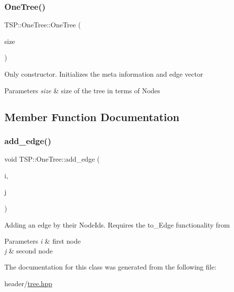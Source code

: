 \subsubsection{\texorpdfstring{One\+Tree()}{OneTree()}}
{\footnotesize\ttfamily T\+S\+P\+::\+One\+Tree\+::\+One\+Tree (\begin{DoxyParamCaption}\item[{size\+\_\+t}]{size }\end{DoxyParamCaption})\hspace{0.3cm}{\ttfamily [inline]}}

Only constructor. Initializes the meta information and edge vector 
\begin{DoxyParams}{Parameters}
{\em size} & size of the tree in terms of Nodes \\
\hline
\end{DoxyParams}


\subsection{Member Function Documentation}
\mbox{\label{classTSP_1_1OneTree_a1fbf0dcc64bb859a04cd9d04298d8608}} 
\subsubsection{\texorpdfstring{add\+\_\+edge()}{add\_edge()}}
{\footnotesize\ttfamily void T\+S\+P\+::\+One\+Tree\+::add\+\_\+edge (\begin{DoxyParamCaption}\item[{Node\+Id}]{i,  }\item[{Node\+Id}]{j }\end{DoxyParamCaption})\hspace{0.3cm}{\ttfamily [inline]}}

Adding an edge by their Node\+Ids. Requires the to\+\_\+\+Edge functionality from
\begin{DoxyParams}{Parameters}
{\em i} & first node \\
\hline
{\em j} & second node \\
\hline
\end{DoxyParams}


The documentation for this class was generated from the following file\+:\begin{DoxyCompactItemize}
\item 
header/\hyperlink{tree_8hpp}{tree.\+hpp}\end{DoxyCompactItemize}
